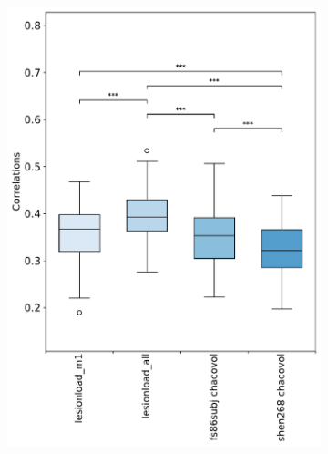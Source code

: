 \documentclass[10pt]{article}
\begin{document}
\begin{figure}
\begin{subfigure}{0.5\textwidth}
  \centering
  \includegraphics[width=1\linewidth]{figures/analysis_2_boxplots_correlations.pdf}
  \caption{}
  \label{fig:sfig1}
\end{subfigure}
\begin{subfigure}{0.5\textwidth}
  \centering

\end{subfigure}
\end{figure}
\end{document}
